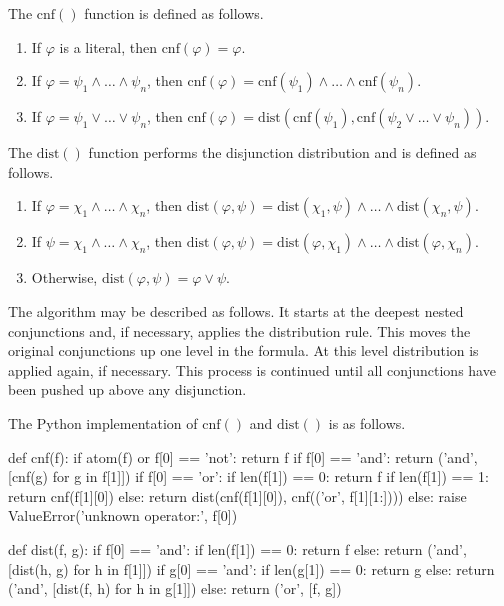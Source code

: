 \documentclass[a4paper,notitlepage]{scrartcl}
\let\phi\varphi
\begin{document}
The $\mathrm{cnf}()$ function is defined as follows.

\begin{enumerate}

\item
If $\phi$ is a literal, then $\mathrm{cnf}(\phi) = \phi$.

\item
If $\phi = \psi_1 \land \ldots \land \psi_n$, then $\mathrm{cnf}(\phi) =
\mathrm{cnf}(\psi_1) \land \ldots \land \mathrm{cnf}(\psi_n)$.

\item
If $\phi = \psi_1 \lor \ldots \lor \psi_n$, then $\mathrm{cnf}(\phi) =
\mathrm{dist}(\mathrm{cnf}(\psi_1), \mathrm{cnf}(\psi_2 \lor \ldots \lor
\psi_n))$.

\end{enumerate}

\noindent
The $\mathrm{dist}()$ function performs the disjunction distribution and is
defined as follows.

\begin{enumerate}

\item
If $\phi = \chi_1 \land \ldots \land \chi_n$, then $\mathrm{dist}(\phi, \psi) =
\mathrm{dist}(\chi_1, \psi) \land \ldots \land \mathrm{dist}(\chi_n, \psi)$.

\item
If $\psi = \chi_1 \land \ldots \land \chi_n$, then $\mathrm{dist}(\phi, \psi) =
\mathrm{dist}(\phi, \chi_1) \land \ldots \land \mathrm{dist}(\phi, \chi_n)$.

\item
Otherwise, $\mathrm{dist}(\phi, \psi) = \phi \lor \psi$.

\end{enumerate}

\noindent
The algorithm may be described as follows.
It starts at the deepest nested conjunctions and, if necessary, applies the
distribution rule.
This moves the original conjunctions up one level in the formula.
At this level distribution is applied again, if necessary.
This process is continued until all conjunctions have been pushed up above any
disjunction.

The Python implementation of $\mathrm{cnf}()$ and $\mathrm{dist}()$ is as
follows.

\begin{code}
def cnf(f):
    if atom(f) or f[0] == 'not':
        return f
    if f[0] == 'and':
        return ('and', [cnf(g) for g in f[1]])
    if f[0] == 'or':
        if len(f[1]) == 0:
            return f
        if len(f[1]) == 1:
            return cnf(f[1][0])
        else:
            return dist(cnf(f[1][0]), cnf(('or', f[1][1:])))
    else:
        raise ValueError('unknown operator:', f[0])

def dist(f, g):
    if f[0] == 'and':
        if len(f[1]) == 0:
            return f
        else:
            return ('and', [dist(h, g) for h in f[1]])
    if g[0] == 'and':
        if len(g[1]) == 0:
            return g
        else:
            return ('and', [dist(f, h) for h in g[1]])
    else:
        return ('or', [f, g])
\end{code}
\end{document}
